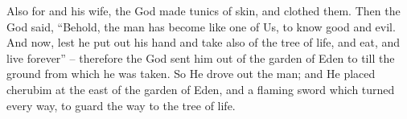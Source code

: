 \bverse Also for  and his wife, the \lord God made tunics of skin, and clothed them.
\bverse Then the \lord God said, ``Behold, the man has become like one of Us, to know good and evil. And now, lest he put out his hand and take also of the tree of life, and eat, and live forever'' --
\bverse therefore the \lord God sent him out of the garden of Eden to till the ground from which he was taken.
\bverse So He drove out the man; and He placed cherubim at the east of the garden of Eden, and a flaming sword which turned every way, to guard the way to the tree of life.



